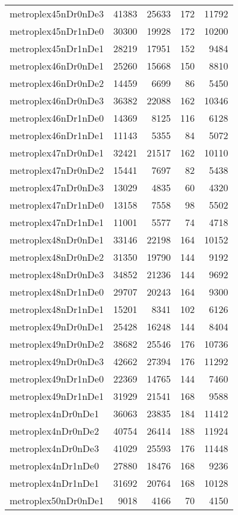 \begin{longtable}{lrrrr}
metroplex45nDr0nDe3 & 41383 & 25633 & 172 & 11792 \\
metroplex45nDr1nDe0 & 30300 & 19928 & 172 & 10200 \\
metroplex45nDr1nDe1 & 28219 & 17951 & 152 & 9484 \\
metroplex46nDr0nDe1 & 25260 & 15668 & 150 & 8810 \\
metroplex46nDr0nDe2 & 14459 & 6699 & 86 & 5450 \\
metroplex46nDr0nDe3 & 36382 & 22088 & 162 & 10346 \\
metroplex46nDr1nDe0 & 14369 & 8125 & 116 & 6128 \\
metroplex46nDr1nDe1 & 11143 & 5355 & 84 & 5072 \\
metroplex47nDr0nDe1 & 32421 & 21517 & 162 & 10110 \\
metroplex47nDr0nDe2 & 15441 & 7697 & 82 & 5438 \\
metroplex47nDr0nDe3 & 13029 & 4835 & 60 & 4320 \\
metroplex47nDr1nDe0 & 13158 & 7558 & 98 & 5502 \\
metroplex47nDr1nDe1 & 11001 & 5577 & 74 & 4718 \\
metroplex48nDr0nDe1 & 33146 & 22198 & 164 & 10152 \\
metroplex48nDr0nDe2 & 31350 & 19790 & 144 & 9192 \\
metroplex48nDr0nDe3 & 34852 & 21236 & 144 & 9692 \\
metroplex48nDr1nDe0 & 29707 & 20243 & 164 & 9300 \\
metroplex48nDr1nDe1 & 15201 & 8341 & 102 & 6126 \\
metroplex49nDr0nDe1 & 25428 & 16248 & 144 & 8404 \\
metroplex49nDr0nDe2 & 38682 & 25546 & 176 & 10736 \\
metroplex49nDr0nDe3 & 42662 & 27394 & 176 & 11292 \\
metroplex49nDr1nDe0 & 22369 & 14765 & 144 & 7460 \\
metroplex49nDr1nDe1 & 31929 & 21541 & 168 & 9588 \\
metroplex4nDr0nDe1 & 36063 & 23835 & 184 & 11412 \\
metroplex4nDr0nDe2 & 40754 & 26414 & 188 & 11924 \\
metroplex4nDr0nDe3 & 41029 & 25593 & 176 & 11448 \\
metroplex4nDr1nDe0 & 27880 & 18476 & 168 & 9236 \\
metroplex4nDr1nDe1 & 31692 & 20764 & 168 & 10128 \\
metroplex50nDr0nDe1 & 9018 & 4166 & 70 & 4150 \\

\end{longtable}
